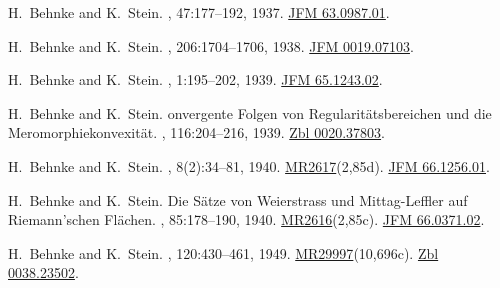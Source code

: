 \documentclass[11pt,a4paper, final, twoside]{article}
\numberwithin{equation}{section}
\begin{document}
\begin{appendices}
\begin{thebibliography}{100}
H.~Behnke and K.~Stein.
,
  47:177--192, 1937.
\newblock \href{http://zbmath.org/?q=an:63.0987.01}{JFM 63.0987.01}.

H.~Behnke and K.~Stein.
, 206:1704--1706, 1938.
\newblock \href{http://zbmath.org/?q=an:0019.07103}{JFM 0019.07103}.

H.~Behnke and K.~Stein.
, 1:195--202, 1939.
\newblock \href{http://zbmath.org/?q=an:65.1243.02}{JFM 65.1243.02}.

H.~Behnke and K.~Stein.
onvergente {F}olgen von {R}egularit\"atsbereichen und die
  {M}eromorphiekonvexit\"at.
, 116:204--216, 1939.
\newblock \href{https://zbmath.org/?q=an:0020.37803}{Zbl 0020.37803}.

H.~Behnke and K.~Stein.
,
  8(2):34--81, 1940.
\newblock \href{http://www.ams.org/mathscinet-getitem?mr=2617}{MR2617}(2,85d).
  \href{http://zbmath.org/?q=an:66.1256.01}{JFM 66.1256.01}.

H.~Behnke and K.~Stein.
\newblock Die {S}\"atze von {W}eierstrass und {M}ittag-{L}effler auf
  {R}iemann'schen {F}l\"achen.
, 85:178--190, 1940.
\newblock \href{http://www.ams.org/mathscinet-getitem?mr=2616}{MR2616}(2,85c).
  \href{http://zbmath.org/?q=an:66.0371.02}{JFM 66.0371.02}.

H.~Behnke and K.~Stein.
, 120:430--461, 1949.
\newblock
  \href{http://www.ams.org/mathscinet-getitem?mr=29997}{MR29997}(10,696c).
  \href{http://zbmath.org/?q=an:0038.23502}{Zbl 0038.23502}.


\end{thebibliography}
\end{appendices}
\end{document}
